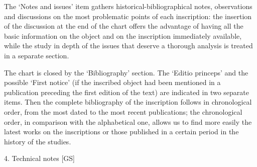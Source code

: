 \documentclass[amsthm,ebook]{saparticle}
\begin{document}
The ‘Notes and issues’ item gathers historical-bibliographical notes, observations and discussions on the most
problematic points of each inscription: the insertion of the discussion at the end of the chart offers the advantage of
having all the basic information on the object and on the inscription immediately available, while the study in depth
of the issues that deserve a thorough analysis is treated in a separate section. 

The chart is closed by the ‘Bibliography’ section. The ‘Editio princeps’ and the possible ‘First notice’ (if the
inscribed object had been mentioned in a publication preceding the first edition of the text) are indicated in two
separate items. Then the complete bibliography of the inscription follows in chronological order, from the most dated
to the most recent publications; the chronological order, in comparison with the alphabetical one, allows us to find
more easily the latest works on the inscriptions or those published in a certain period in the history of the studies. 

4. Technical notes [GS]
\end{document}
